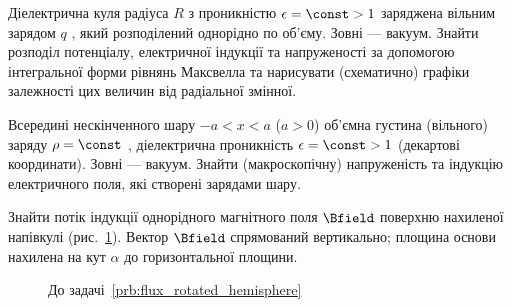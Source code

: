 \begin{problem}%
Діелектрична куля радіуса $R$  з проникністю  $\epsilon =\const > 1$ заряджена вільним зарядом $q$ , який розподілений однорідно по об’єму. Зовні ---
вакуум. Знайти розподіл потенціалу, електричної індукції та напруженості за допомогою інтегральної форми рівнянь Максвелла та нарисувати (схематично)
графіки залежності цих величин від радіальної змінної.
\end{problem}


\begin{problem}%
Всередині нескінченного шару  $-a < x < a$  ($a> 0 $) об’ємна густина (вільного) заряду $\rho = \const$ , діелектрична проникність $\epsilon =\const >
1$   (декартові координати). Зовні --- вакуум. Знайти (макроскопічну) напруженість та індукцію електричного поля, які створені зарядами шару.
\end{problem}

\begin{problem}\label{prb:flux_rotated_hemisphere}
Знайти потік індукції однорідного магнітного поля $\Bfield$ поверхню нахиленої напівкулі (рис.~\ref{pic:flux_rotated_hemisphere}). Вектор $\Bfield$
спрямований  вертикально; площина основи нахилена на кут $\alpha$ до горизонтальної площини.
\end{problem}

\begin{figure}[h!]\centering
\caption{До задачі~\ref{prb:flux_rotated_hemisphere}}
\label{pic:flux_rotated_hemisphere}
\end{figure}



